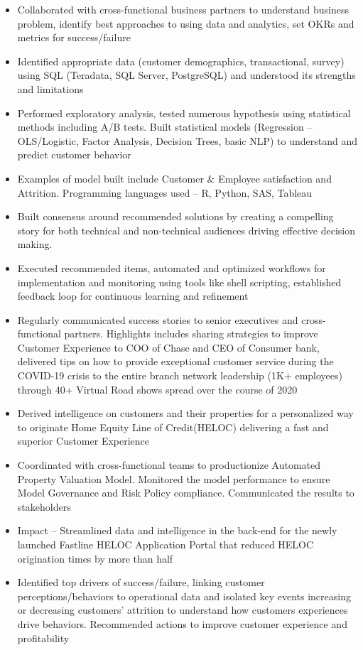 \documentclass[a4paper,11pt]{article}
\begin{document}
\begin{itemize}\parskip=0cm
\item Collaborated with cross-functional business partners to understand business problem, identify best approaches to using data and analytics, set OKRs and metrics for success/failure 
\item Identified appropriate data (customer demographics, transactional, survey) using SQL (Teradata, SQL Server, PostgreSQL) and understood its strengths and limitations
\item Performed exploratory analysis, tested numerous hypothesis using statistical methods including A/B tests. Built statistical models (Regression – OLS/Logistic, Factor Analysis, Decision Trees, basic NLP) to understand and predict customer behavior
\item Examples of model built include Customer \& Employee satisfaction and Attrition. Programming languages used – R, Python, SAS, Tableau
\item Built consensus around recommended solutions by creating a compelling story for both technical and non-technical audiences driving effective decision making. 
\item Executed recommended items, automated and optimized workflows for implementation and monitoring using tools like shell scripting, established feedback loop for continuous learning and refinement
\item Regularly communicated success stories to senior executives and cross-functional partners. Highlights includes sharing strategies to improve Customer Experience to COO of Chase and CEO of Consumer bank, delivered tips on how to provide exceptional customer service during the COVID-19 crisis to the entire branch network leadership (1K+ employees) through 40+ Virtual Road shows spread over the course of 2020
\item Derived intelligence on customers and their properties for a personalized way to originate Home Equity Line of Credit(HELOC) delivering a fast and superior Customer Experience
\item Coordinated with cross-functional teams to productionize Automated Property Valuation Model. Monitored the model performance to ensure Model Governance and Risk Policy compliance. Communicated the results to stakeholders
\item Impact – Streamlined data and intelligence in the back-end for the newly launched Fastline HELOC Application Portal that reduced HELOC origination times by more than half
\item Identified top drivers of success/failure, linking customer perceptions/behaviors to operational data and isolated key events increasing or decreasing customers’ attrition to understand how customers experiences drive behaviors. Recommended actions to improve customer experience and profitability

\end{itemize}
\end{document}
